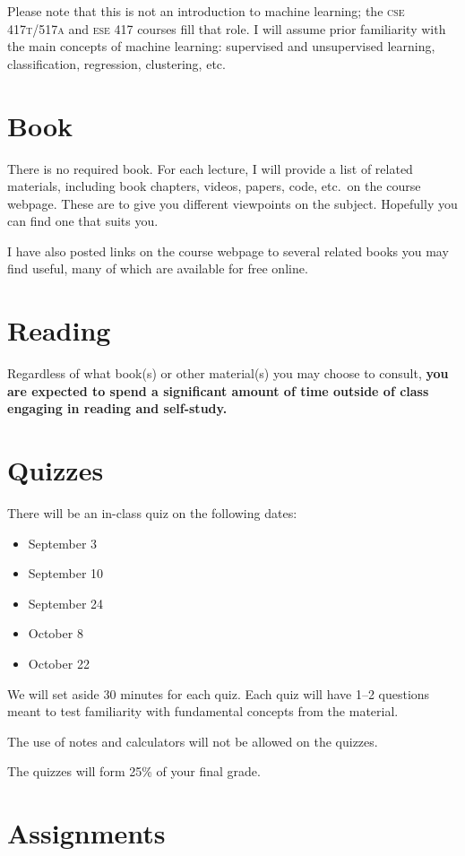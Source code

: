\documentclass{article}
\newcommand{\acro}[1]{\textsc{\MakeLowercase{#1}}}
\begin{document}
Please note that this is not an introduction to machine learning; the \acro{CSE
  417T/517A} and \acro{ESE 417} courses fill that role.  I will assume prior
familiarity with the main concepts of machine learning: supervised and
unsupervised learning, classification, regression, clustering, etc.

\section*{Book}

There is no required book. For each lecture, I will provide a list of related
materials, including book chapters, videos, papers, code, etc.\ on the course
webpage.  These are to give you different viewpoints on the subject.  Hopefully
you can find one that suits you.

I have also posted links on the course webpage to several related books you may
find useful, many of which are available for free online.

\section*{Reading}

Regardless of what book(s) or other material(s) you may choose to consult,
\textbf{you are expected to spend a significant amount of time outside of class
  engaging in reading and self-study.}

\section*{Quizzes}

There will be an in-class quiz on the following dates:
\begin{itemize}
  \item September 3
  \item September 10
  \item September 24
  \item October 8
  \item October 22
\end{itemize}
We will set aside 30 minutes for each quiz. Each quiz will have 1--2
questions meant to test familiarity with fundamental concepts from the material.

The use of notes and calculators will not be allowed on the quizzes.

The quizzes will form 25\% of your final grade.

\section*{Assignments}
\end{document}
